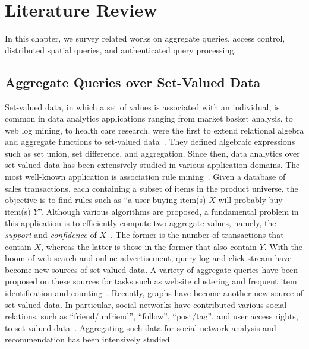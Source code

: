 \chapter{Literature Review}\label{chap:related-works}

In this chapter, we survey related works on aggregate queries, access control, distributed spatial queries, and authenticated query processing.

\section{Aggregate Queries over Set-Valued Data}

Set-valued data, in which a set of values is associated with an individual, is common in data analytics applications ranging from market basket analysis, to web log mining, to health care research. \citeauthor{10.1145/32204.32219} were the first to extend relational algebra and aggregate functions to set-valued data~\cite{10.1145/32204.32219}. They defined algebraic expressions such as set union, set difference, and aggregation. Since then, data analytics over set-valued data has been extensively studied in various application domains. The most well-known application is association rule mining~\cite{10.1145/170035.170072}. Given a database of sales transactions, each containing a subset of items in the product universe, the objective is to find rules such as ``a user buying item(s) $X$ will probably buy item(s) $Y$''. %
Although various algorithms are proposed, a fundamental problem in this application is to efficiently compute two aggregate values, namely, the \emph{support} and \emph{confidence} of $X$~\cite{Agrawal:1994:FAM:645920.672836}. The former is the number of transactions that contain $X$, whereas the latter is those in the former that also contain $Y$. With the boom of web search and online advertisement, query log and click stream have become new sources of set-valued data. A variety of aggregate queries have been proposed on these sources for tasks such as website clustering and frequent item identification and counting~\cite{10.14778/2367502.2367508}. Recently, graphs have become another new source of set-valued data. In particular, social networks have contributed various social relations, such as ``friend/unfriend'', ``follow'', ``post/tag'', and user access rights, to set-valued data~\cite{10.1145/1592568.1592585}. Aggregating such data for social network analysis and recommendation has been intensively studied~\cite{10.1145/1367497.1367646}.

